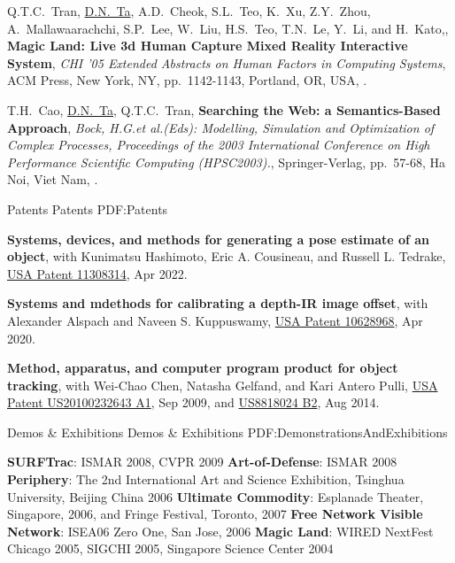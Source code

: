 \documentclass[letterpaper,MMMyyyy,nonstopmode]{simpleresumecv}
\begin{document}
\begin{Body}
\Gap
\NumberedItem{[2]}
{ Q.T.C.~Tran, \underline{D.N.~Ta},  A.D.~Cheok, S.L.~Teo, K.~Xu, Z.Y.~Zhou, A.~Mallawaarachchi, S.P.~Lee, W.~Liu, H.S.~Teo, T.N.~Le, Y.~Li, and H.~Kato,,
\textbf{Magic Land: Live 3d Human Capture Mixed Reality Interactive System},
\textit{CHI '05 Extended Abstracts on Human Factors in Computing Systems},
ACM Press, New York, NY, 
pp.~1142-1143,
Portland, OR, USA,
.}


\Gap
\NumberedItem{[1]}
{ T.H.~Cao, \underline{D.N.~Ta}, Q.T.C.~Tran,
\textbf{Searching the Web: a Semantics-Based Approach},
\textit{Bock, H.G.et al.(Eds): Modelling, Simulation and Optimization of Complex Processes, Proceedings of the 2003 International Conference on High Performance Scientific Computing (HPSC2003).},
Springer-Verlag, 
pp.~57-68,
Ha Noi, Viet Nam,
.}


\Section
{Patents}
{Patents}
{PDF:Patents}

\BulletItem
\textbf{Systems, devices, and methods for generating a pose estimate of an object}, with Kunimatsu Hashimoto, Eric A. Cousineau, and Russell L. Tedrake, \href{https://www.freepatentsonline.com/11308314.html}{USA Patent 11308314}, Apr 2022.

\BulletItem
\textbf{Systems and mdethods for calibrating a depth-IR image offset}, with Alexander Alspach and Naveen S. Kuppuswamy, \href{https://www.freepatentsonline.com/10628968.html}{USA Patent 10628968}, Apr 2020.

\BulletItem
\textbf{Method, apparatus, and computer program product for object tracking}, with Wei-Chao Chen, Natasha Gelfand, and Kari Antero Pulli, \href{https://www.freepatentsonline.com/y2010/0232643.html}{USA Patent US20100232643 A1}, Sep 2009, and \href{https://www.freepatentsonline.com/8818024.html}{US8818024 B2}, Aug 2014.


\Section
{Demos \& Exhibitions}
{Demos \& Exhibitions}
{PDF:DemonstrationsAndExhibitions}

\BulletItem
\textbf{SURFTrac}: ISMAR 2008, CVPR 2009
\BulletItem
\textbf{Art-of-Defense}: ISMAR 2008
\BulletItem
\textbf{Periphery}: The 2nd International Art and Science Exhibition, Tsinghua University, Beijing China 2006
\BulletItem
\textbf{Ultimate Commodity}: Esplanade Theater, Singapore, 2006, and Fringe Festival, Toronto, 2007
\BulletItem
\textbf{Free Network Visible Network}: ISEA06 Zero One, San Jose, 2006
\BulletItem
\textbf{Magic Land}: WIRED NextFest Chicago 2005, SIGCHI 2005, Singapore Science Center 2004


\end{Body}
\end{document}
